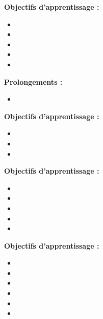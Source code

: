 \par\noindent\textbf{Objectifs d'apprentissage :}
\begin{itemize}
    \item \useobj[C4A1ca]
    \item \useobj[C4A1cb]
    \item \useobj[C4A1cc]
    \item \useobj[C4A1ai]
    \item \useobj[C4A1aj]
\end{itemize}
\par\noindent\textbf{Prolongements :}
\begin{itemize}
    \item \usepro[C4A1aa]
\end{itemize}
\endsequence

\par\noindent\textbf{Objectifs d'apprentissage :}
\begin{itemize}
    \item \useobj[C4B1da]
    \item \useobj[C4B1ea]
    \item \useobj[C4B1ei]
\end{itemize}
\endsequence

\par\noindent\textbf{Objectifs d'apprentissage :}
\begin{itemize}
    \item \useobj[C4A1da]
    \item \useobj[C4A1db]
    \item \useobj[C4A1dc]
    \item \useobj[C4A1dd]
    \item \useobj[C4A1de]
\end{itemize}
\endsequence

\par\noindent\textbf{Objectifs d'apprentissage :}
\begin{itemize}
    \item \useobj[C4A1df]
    \item \useobj[C4A1ea]
    \item \useobj[C4A1eb]
    \item \useobj[C4A1ec]
    \item \useobj[C4A1ed]
    \item \useobj[C4A1ef]
\end{itemize}
\endsequence

